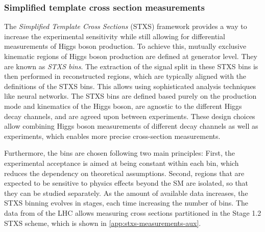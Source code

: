 
\subsubsection{Simplified template cross section measurements}
The \emph{Simplified Template Cross Sections} (STXS) framework provides a way to increase the experimental sensitivity while still allowing for differential measurements of Higgs boson production.
To achieve this, mutually exclusive kinematic regions of Higgs boson production are defined at generator level. They are known as \emph{STXS bins}. 
The extraction of the signal split in these STXS bins is then performed in reconstructed regions, which are typically aligned with the definitions of the STXS bins. This allows using sophisticated analysis techniques like neural networks.
The STXS bins are defined based purely on the production mode and kinematics of the Higgs boson, are agnostic to the different Higgs decay channels, and are agreed upon between experiments.
These design choices allow combining Higgs boson measurements of different decay channels as well as experiments, which enables more precise cross-section measurements.

Furthermore, the bins are chosen following two main principles: First, the experimental acceptance is aimed at being constant within each bin, which reduces the dependency on theoretical assumptions. Second, regions that are expected to be sensitive to physics effects beyond the SM are isolated, so that they can be studied separately.
As the amount of available data increases, the STXS binning evolves in stages, each time increasing the number of bins. 
The data from \RunTwo of the LHC allows measuring cross sections partitioned in the Stage 1.2 STXS scheme, which is shown in \cref{app:stxs-measurements-aux}.

